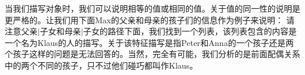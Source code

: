 当我们描写对象时，我们可以说明相等的值或相同的值。关于值的同一性的说明是更严格的。让我们用下面Max的父亲和母亲的孩子们的信息作为例子来说明：
\ea
{}
\z
请注意\textsc{父亲$|$子女}和\textsc{母亲$|$子女}的路径下面，我们找到一个列表，该列表包含的内容是一个名为Klaus的人的描写。关于该特征描写是指Peter和Anna的一个孩子还是两个孩子这样的问题是无法回答的。当然，完全有可能，我们分析的是前面配偶关系中的两个不同的孩子，只不过他们碰巧都叫作Klaus。

